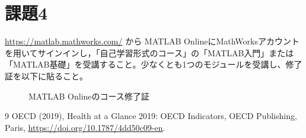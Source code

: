 \documentclass[dvipdfmx]{jsarticle}
\begin{document}
\section*{課題4}
\url{https://matlab.mathworks.com/} から MATLAB OnlineにMathWorksアカウントを用いてサインインし，「自己学習形式のコース」の「MATLAB入門」または「MATLAB基礎」を受講すること。少なくとも1つのモジュールを受講し、修了証を以下に貼ること。
\begin{figure}[H]
\centering
\caption{MATLAB Onlineのコース修了証}
\end{figure}

\begin{thebibliography}{9}
OECD (2019), Health at a Glance 2019: OECD Indicators, OECD Publishing, Paris,
\url{https://doi.org/10.1787/4dd50c09-en}.
\end{thebibliography}
\end{document}

